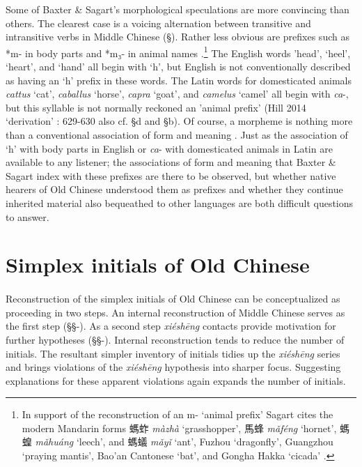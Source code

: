 Some of Baxter \& Sagart's morphological speculations are more
convincing than others. The clearest case is a voicing alternation
between transitive and intransitive verbs in Middle Chinese (§). Rather
less obvious are prefixes such as *m{}- in body parts and *m₃- in animal
names 
\citeyearpar[55-56]{Baxter2014OldChinese}.\footnote{In support of the reconstruction of an m-
  `animal prefix' Sagart cites the modern Mandarin forms 螞蚱
   \emph{màzhà} `grasshopper', 馬蜂  \emph{mǎféng} `hornet', 螞蝗
   \emph{mǎhuáng} `leech', and 螞蟻  \emph{mǎyǐ} `ant', Fuzhou  \emph{{}}
   \emph{{}} `dragonfly', Guangzhou  \emph{{}} `praying
  mantis', Bao'an Cantonese  \emph{{}} `bat', and Gongha
  Hakka \emph{{}} `cicada' 
  \citeyearpar[85]{Sagart1999}.} The English words
'head', `heel', `heart', and `hand' all begin with `h', but English is
not conventionally described as having an `h' prefix in these words. The
Latin words for domesticated animals  \emph{cattus} `cat',
 \emph{caballus} `horse',  \emph{capra} `goat', and \emph{camelus} `camel'
all begin with \emph{ca}-, but this syllable is not normally reckoned an
'animal prefix' (Hill 2014 `derivation' : 629-630 also cf. §d and
§b).
Of course, a
morpheme is nothing more than a conventional as­so­ci­a­tion of form and
meaning 
\citep[65-76]{Hockett1987refurbishing}.
Just as the association of `h' with body
parts in English or \emph{ca}- with domesticated animals in Latin are
available to any listener; the associations of form and meaning that
Baxter \& Sagart index with these prefixes are there to be observed, but
whether native hearers of Old Chinese understood them as prefixes and
whether they continue inherited material also bequeathed to other
languages are both difficult questions to answer.

\section{Simplex initials of Old
Chinese}

\paragraph{}
\label{par:lex-initials-of-old-chinese}
Reconstruction of the simplex initials of Old Chinese can be
conceptualized as proceeding in two steps. An internal re­con­struction
of Middle Chinese serves as the first step (§§-). As a second step
 \emph{xiéshēng} contacts provide motivation for further hypotheses
(§§-). Internal re­con­struction tends to reduce the number of initials.
The resultant simpler inventory of initials tidies up the
 \emph{xiéshēng} series and brings violations of the \emph{xiéshēng}
hypothesis into sharper focus. Suggesting explanations for these
apparent violations again expands the number of initials.

